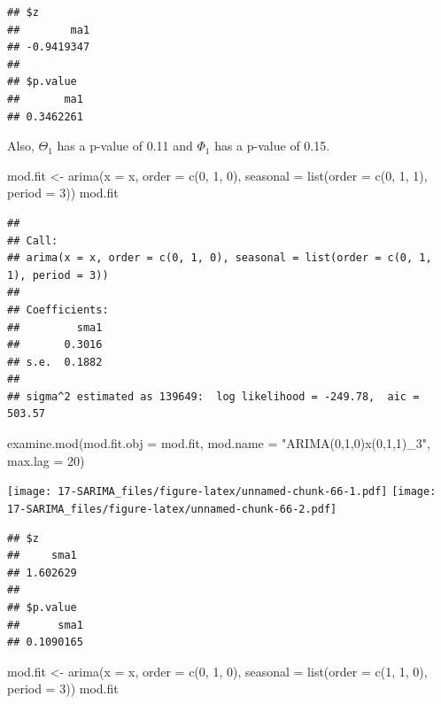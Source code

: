 \documentclass[
]{book}
\newenvironment{Shaded}{\begin{snugshade}}{\end{snugshade}}
\newcommand{\AttributeTok}[1]{\textcolor[rgb]{0.77,0.63,0.00}{#1}}
\newcommand{\DecValTok}[1]{\textcolor[rgb]{0.00,0.00,0.81}{#1}}
\newcommand{\FunctionTok}[1]{\textcolor[rgb]{0.00,0.00,0.00}{#1}}
\newcommand{\NormalTok}[1]{#1}
\newcommand{\OtherTok}[1]{\textcolor[rgb]{0.56,0.35,0.01}{#1}}
\newcommand{\StringTok}[1]{\textcolor[rgb]{0.31,0.60,0.02}{#1}}
\theoremstyle{definition}
\theoremstyle{definition}
\theoremstyle{definition}
\theoremstyle{definition}
\theoremstyle{remark}
\begin{document}
\begin{verbatim}
## $z
##        ma1 
## -0.9419347 
## 
## $p.value
##       ma1 
## 0.3462261
\end{verbatim}

Also, \(\Theta_1\) has a p-value of 0.11 and \(\Phi_1\) has a p-value of 0.15.

\begin{Shaded}
\begin{Highlighting}[]
\NormalTok{mod.fit }\OtherTok{\textless{}{-}} \FunctionTok{arima}\NormalTok{(}\AttributeTok{x =}\NormalTok{ x, }\AttributeTok{order =} \FunctionTok{c}\NormalTok{(}\DecValTok{0}\NormalTok{, }\DecValTok{1}\NormalTok{, }\DecValTok{0}\NormalTok{), }\AttributeTok{seasonal =} \FunctionTok{list}\NormalTok{(}\AttributeTok{order =} \FunctionTok{c}\NormalTok{(}\DecValTok{0}\NormalTok{, }\DecValTok{1}\NormalTok{, }\DecValTok{1}\NormalTok{), }\AttributeTok{period =} \DecValTok{3}\NormalTok{))}
\NormalTok{  mod.fit}
\end{Highlighting}
\end{Shaded}

\begin{verbatim}
## 
## Call:
## arima(x = x, order = c(0, 1, 0), seasonal = list(order = c(0, 1, 1), period = 3))
## 
## Coefficients:
##         sma1
##       0.3016
## s.e.  0.1882
## 
## sigma^2 estimated as 139649:  log likelihood = -249.78,  aic = 503.57
\end{verbatim}

\begin{Shaded}
\begin{Highlighting}[]
  \FunctionTok{examine.mod}\NormalTok{(}\AttributeTok{mod.fit.obj =}\NormalTok{ mod.fit, }\AttributeTok{mod.name =} \StringTok{"ARIMA(0,1,0)x(0,1,1)\_3"}\NormalTok{, }\AttributeTok{max.lag =} \DecValTok{20}\NormalTok{)}
\end{Highlighting}
\end{Shaded}

\texttt{[image: 17-SARIMA\_files/figure-latex/unnamed-chunk-66-1.pdf]} \texttt{[image: 17-SARIMA\_files/figure-latex/unnamed-chunk-66-2.pdf]}

\begin{verbatim}
## $z
##     sma1 
## 1.602629 
## 
## $p.value
##      sma1 
## 0.1090165
\end{verbatim}

\begin{Shaded}
\begin{Highlighting}[]
\NormalTok{mod.fit }\OtherTok{\textless{}{-}} \FunctionTok{arima}\NormalTok{(}\AttributeTok{x =}\NormalTok{ x, }\AttributeTok{order =} \FunctionTok{c}\NormalTok{(}\DecValTok{0}\NormalTok{, }\DecValTok{1}\NormalTok{, }\DecValTok{0}\NormalTok{), }\AttributeTok{seasonal =} \FunctionTok{list}\NormalTok{(}\AttributeTok{order =} \FunctionTok{c}\NormalTok{(}\DecValTok{1}\NormalTok{, }\DecValTok{1}\NormalTok{, }\DecValTok{0}\NormalTok{), }\AttributeTok{period =} \DecValTok{3}\NormalTok{))}
\NormalTok{  mod.fit}
\end{Highlighting}
\end{Shaded}
\end{document}

